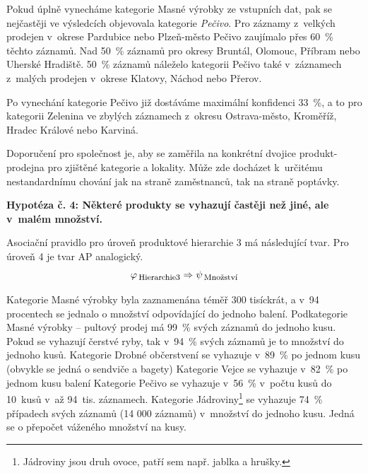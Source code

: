 Pokud úplně vynecháme kategorie Masné výrobky ze vstupních dat, pak se nejčastěji ve výsledcích objevovala kategorie \emph{Pečivo}. Pro záznamy z~velkých prodejen v~okrese Pardubice nebo Plzeň-město Pečivo zaujímalo přes 60~\% těchto záznamů. Nad 50~\% záznamů pro okresy Bruntál, Olomouc, Příbram nebo Uherské Hradiště. 50~\% záznamů náleželo kategorii Pečivo také v~záznamech z~malých prodejen v~okrese Klatovy, Náchod nebo Přerov.

Po vynechání kategorie Pečivo již dostáváme maximální konfidenci 33~\%, a to pro kategorii Zelenina ve zbylých záznamech z~okresu Ostrava-město, Kroměříž, Hradec Králové nebo Karviná.

Doporučení pro společnost je, aby se zaměřila na konkrétní dvojice produkt-prodejna pro zjištěné kategorie a lokality. Může zde docházet k~určitému nestandardnímu chování jak na straně zaměstnanců, tak na straně poptávky.

\vspace*{1em}




\textbf{Hypotéza č. 4: Některé produkty se vyhazují častěji než jiné, ale v~malém množství.}

Asociační pravidlo pro úroveň produktové hierarchie 3 má následující tvar. Pro úroveň 4 je tvar AP analogický.
\begin{equation}
    \varphi_{\mbox{\,\footnotesize Hierarchie3}} \Rightarrow \psi_{\mbox{\,\footnotesize Množství}}
\end{equation}

Kategorie Masné výrobky byla zaznamenána téměř 300 tisíckrát, a v~94 procentech se jednalo o množství odpovídající do jednoho balení. Podkategorie Masné výrobky -- pultový prodej má 99~\% svých záznamů do jednoho kusu.
Pokud se vyhazují čerstvé ryby, tak v~94~\% svých záznamů je to množství do jednoho kusů. Kategorie Drobné občerstvení %
 se vyhazuje v~89~\% po jednom kusu (obvykle se jedná o sendviče a bagety)
Kategorie Vejce se vyhazuje v~82~\% po jednom kusu balení
Kategorie Pečivo se vyhazuje v~56~\% v~počtu kusů do 10~kusů v~až 94~tis. záznamech.
Kategorie Jádroviny\footnote{Jádroviny jsou druh ovoce, patří sem např. jablka a hrušky.} se vyhazuje 74~\% případech svých záznamů (14 000 záznamů) v~množství do jednoho kusu. Jedná se o přepočet váženého množství na kusy.

